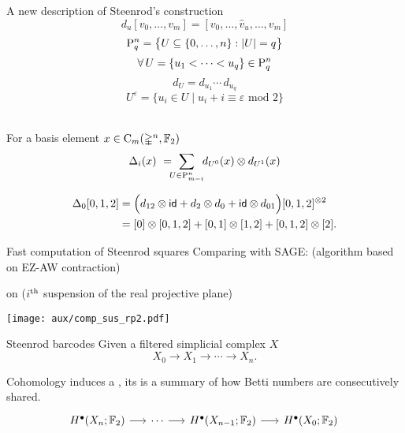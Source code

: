 \begin{frame}[fragile]{A new description of Steenrod's construction}
	\pause
	\[
	d_u[v_0, \dots, v_m] = [v_0, \dots, \widehat v_u, \dots, v_m]
	\]
	\pause\vspace*{-15pt}
	\[
	\rP_q^n = \set[\big]{U \subseteq \{0, \dots, n\} : \bars{U} = q}
	\]
	\pause\vspace*{-15pt}
	\[
	\forall \, U = \{u_1 < \dots < u_q\} \in \rP_q^n
	\]
	\pause\vspace*{-15pt}
	\[
	d_U = d_{u_1} \dotsm \, d_{u_q}
	\]
	\pause\vspace*{-15pt}
	\[
	U^\varepsilon = \big\{ u_i \in U \mid u_i + i \equiv \varepsilon \text{ mod } 2 \big\}
	\]

	\bigskip\pause
	 \\
	For a basis element $x \in \gchains_m(\gsimplex^n, \Ftwo)$
	\vspace*{-5pt}
	\[
	\Delta_i(x) \ = \!\!\! \sum_{U \in \rP_{m-i}^n} \!\! d_{U^0}(x) \otimes d_{U^1}(x)
	\]
	\vspace*{-10pt}

	\pause
	\vspace*{-5pt}
	\begin{align*}
	\Delta_0 [0,1,2] &=
	\Big( d_{12} \otimes \id + d_2 \otimes d_0 + \id \otimes d_{01} \Big) [0,1,2]^{\otimes 2} \\ &=
	[0] \otimes [0,1,2] + [0,1] \otimes [1,2] + [0,1,2] \otimes [2].
	\end{align*}
\end{frame}

\begin{frame}{Fast computation of Steenrod squares}
	\pause
	Comparing with SAGE: (algorithm based on EZ-AW contraction)

	\smallskip\pause
	 on  ($i^\th$ suspension of the real projective plane)

	\medskip
	\texttt{[image: aux/comp\_sus\_rp2.pdf]}
\end{frame}

\begin{frame}[fragile]{Steenrod barcodes}
	\pause
	Given a filtered simplicial complex $X$
	\[
	X_0 \to X_1 \to \cdots \to X_n.
	\]

	\pause
	Cohomology induces a , its  is a summary of how Betti numbers are consecutively shared.\\

	\smallskip
	\phantom{A cohomology operation induces an endomorphism}
	\[
	\begin{tikzcd}[column sep = 15]
		H^\bullet(X_n; \Ftwo) \arrow[r] & \cdots \arrow[r] & H^\bullet(X_{n-1}; \Ftwo) \arrow[r] & H^\bullet(X_0; \Ftwo) \\
		\phantom{H^\bullet(X_n; \Ftwo)} \arrow[u, "\phantom{Sq^k}", phantom] & \phantom{\cdots} & \phantom{H^\bullet(X_{n-1}; \Ftwo)} & \phantom{H^\bullet(X_0; \Ftwo)} \arrow[u, "\phantom{Sq^k}", phantom] \phantom{.}
	\end{tikzcd}
	\]
\end{frame}

